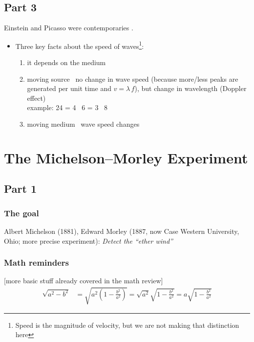 \documentclass[pagesize,headsepline,10pt,parskip=half]{scrreprt}
\newenvironment{aside}
{\begin{mdframed}[style=0,%
  leftline=false,rightline=false,leftmargin=2em,rightmargin=2em,%
  innerleftmargin=0pt,innerrightmargin=0pt,linewidth=0.75pt,%
  skipabove=7pt,skipbelow=7pt]\small}
{\end{mdframed}}
\begin{document}
      \subsection{Part 3}
        \begin{aside}
          Einstein and Picasso were contemporaries \parencite{miller2008einstein}.
        \end{aside}
        \begin{itemize}
          \item Three key facts about the speed of waves\footnote{Speed is the magnitude of velocity, but we are not making that distinction here}:
            \begin{enumerate}
              \item it depends on the medium
              \item moving source \rightarrow~no change in wave speed
                (because more/less peaks are generated per unit time
                and $v = \lambda \, f$), but change in wavelength (Doppler effect)\\
                example: 24 = 4 \times \, 6 = 3 \times \, 8
              \item moving medium \rightarrow~wave speed changes
            \end{enumerate}
        \end{itemize}

    \clearpage
    \section{The Michelson–Morley Experiment}
      \subsection{Part 1}
        \subsubsection{The goal}
          Albert Michelson (1881), Edward Morley (1887, now Case Western University, Ohio; more precise experiment):
          \emph{Detect the “ether wind”}

        \subsubsection{Math reminders}
          [more basic stuff already covered in the math review]
          \begin{align*}
            \sqrt{a^2 - b^2}
              &= \sqrt{a^2 \left(1 - \frac{b^2}{a^2}\right)}
               = \sqrt{a^2} \sqrt{1 - \frac{b^2}{a^2}}
               = a \sqrt{1 - \frac{b^2}{a^2}}
             \end{align*}
\end{document}

